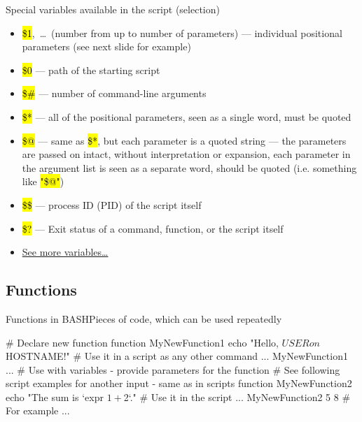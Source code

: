 \documentclass[compress, ucs, xelatex, 11pt, xcolor=svgnames,
  hyperref={
    bookmarks=true,
    unicode=true,
    colorlinks=true,
    pdftitle={Linux, command line and MetaCentrum},
    plainpages=false,
    pdfauthor={Vojtech Zeisek},
    pdfsubject={Course about use of Linux command line, writing shell scripts and using MetaCentrum of CESNET},
    pdfcreator={XeLaTeX},
    pdfkeywords={Linux, GNU, BASH, shell, command line, MetaCentrum},
    linkcolor=DarkRed,
    anchorcolor=DarkBlue,
    citecolor=Indigo,
    filecolor=NavyBlue,
    menucolor=DarkMagenta,
    urlcolor=DarkBlue,
    pdftex},
  url={hyphens, lowtilde} %
  ]{beamer}
\renewcommand{\texttt}[1]{\hl{\ttfamily #1}}
\renewcommand{\alert}[1]{\textcolor{red}{#1}}
\begin{document}
\begin{frame}{Special variables available in the script (selection)}
  \begin{itemize}
    \item \alert{\texttt{\$1}},~\ldots~(number from \texttt{1} up to number of parameters) --- individual positional parameters (see next slide for example)
    \item \alert{\texttt{\$0}} --- path of the starting script
    \item \alert{\texttt{\$\#}} --- number of command-line arguments
    \item \alert{\texttt{\$*}} --- all of the positional parameters, seen as a single word, must be quoted
    \item \alert{\texttt{\$@}} --- same as \texttt{\$*}, but each parameter is a quoted string --- the parameters are passed on intact, without interpretation or expansion, each parameter in the argument list is seen as a separate word, should be quoted (i.e. something like \texttt{"\$@"})
    \item \alert{\texttt{\$\$}} --- process ID (PID) of the script itself
    \item \alert{\texttt{\$?}} --- Exit status of a command, function, or the script itself
    \item \href{https://www.tldp.org/LDP/abs/html/internalvariables.html}{See more variables\ldots}
  \end{itemize}
\end{frame}

\subsection{Functions}

\begin{frame}[fragile]{Functions in BASH}{Pieces of code, which can be used repeatedly}
  \begin{bashcode}
    # Declare new function
    function MyNewFunction1 {
      echo "Hello, $USER on $HOSTNAME!"
      }
    # Use it in a script as any other command
    ...
    MyNewFunction1
    ...
    # Use with variables - provide parameters for the function
    # See following script examples for another input - same as in scripts
    function MyNewFunction2 {
      echo "The sum is `expr $1 + $2`."
      }
    # Use it in the script
    ...
    MyNewFunction2 5 8 # For example
    ...
  \end{bashcode}
\end{frame}
\end{document}
